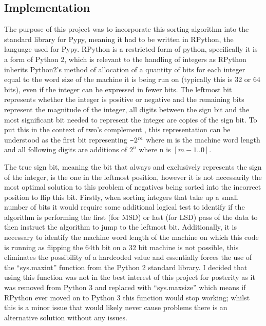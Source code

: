 \documentclass[12pt]{article}
\newcommand{\minus}{\scalebox{0.75}[1.0]{$-$}}
\begin{document}
	\subsection{Implementation}
  \label{ssec:negativesImplementation}
	The purpose of this project was to incorporate this sorting algorithm into the standard library for Pypy, meaning it had to be written in RPython, the language used for Pypy. RPython is a restricted form of python, specifically it is a form of Python 2, which is relevant to the handling of integers as RPython inherits Python2’s method of allocation of a quantity of bits for each integer equal to the word size of the machine it is being run on (typically this is 32 or 64 bits), even if the integer can be expressed in fewer bits. The leftmost bit represents whether the integer is positive or negative and the remaining bits represent the magnitude of the integer, all digits between the sign bit and the most significant bit needed to represent the integer are copies of the sign bit. To put this in the context of two’s complement , this representation can be understood as the first bit representing $\minus2^{m}$ where m is the machine word length and all following digits are additions of $2^{n}$ where n is $[m-1..0]$.
	\par
	\par
	The true sign bit, meaning the bit that always and exclusively represents the sign of the integer, is the one in the leftmost position, however it is not necessarily the most optimal solution to this problem of negatives being sorted into the incorrect position to flip this bit. Firstly, when sorting integers that take up a small number of bits it would require some additional logical test to identify if the algorithm is performing the first (for MSD) or last (for LSD) pass of the data to then instruct the algorithm to jump to the leftmost bit. Additionally, it is necessary to identify the machine word length of the machine on which this code is running as flipping the 64th bit on a 32 bit machine is not possible, this eliminates the possibility of a hardcoded value and essentially forces the use of the “sys.maxint” function from the Python 2 standard library. I decided that using this function was not in the best interest of this project for posterity as it was removed from Python 3 and replaced with “sys.maxsize” which means if RPython ever moved on to Python 3 this function would stop working; whilst this is a minor issue that would likely never cause problems there is an alternative solution without any issues.
	\par
\end{document}
